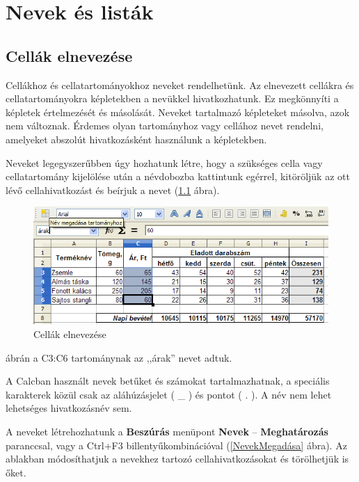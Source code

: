 \chapter{Nevek és listák}
\thispagestyle{empty}

\section{Cellák elnevezése }

Cellákhoz és cellatartományokhoz neveket rendelhetünk. Az
elnevezett cellákra és cellatartományokra képletekben a
nevükkel hivatkozhatunk. Ez megkönnyíti a képletek
értelmezését és másolását. Neveket tartalmazó
képleteket másolva, azok nem változnak. Érdemes olyan
tartományhoz vagy cellához nevet rendelni, amelyeket abszolút
hivatkozásként használunk a képletekben.

Neveket legegyszerűbben úgy hozhatunk létre, hogy a
szükséges cella vagy cellatartomány kijelölése után a
névdobozba kattintunk egérrel, kitöröljük az ott lévő
cellahivatkozást és beírjuk a nevet (\ref{CellákElnevezése} ábra).

\begin{figure}[!h]
\begin{center}
\includegraphics[width=14.395cm]{oocalcv2-img104.png}
\caption{Cellák elnevezése}\label{CellákElnevezése}
\end{center}
\end{figure}

 ábrán a C3:C6 tartománynak az
,,árak'' nevet adtuk.

A Calcban használt nevek betűket és számokat tartalmazhatnak,
a speciális karakterek közül csak az aláhúzásjelet ( \_ )
és pontot ( . ). A név nem lehet lehetséges hivatkozásnév
sem.

A neveket létrehozhatunk a \textbf{Beszúrás} menüpont
\textbf{Nevek} --  \textbf{Meghatározás} paranccsal, vagy a Ctrl+F3
billentyűkombinációval (\ref{NevekMegadása} ábra). Az ablakban
módosíthatjuk a nevekhez tartozó cellahivatkozásokat és
törölhetjük is őket.

